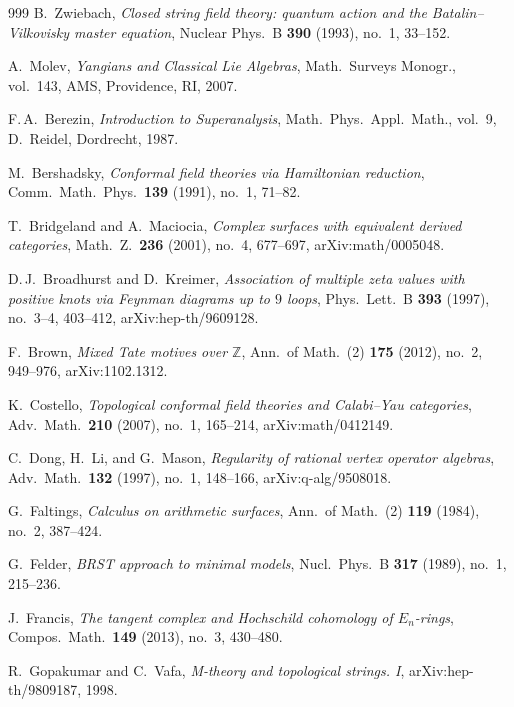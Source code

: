 \documentclass[11pt]{memoir}
\begin{document}
\begin{thebibliography}{999}
B.~Zwiebach, \emph{Closed string field theory: quantum action and the Batalin--Vilkovisky master equation}, Nuclear Phys.\ B \textbf{390} (1993), no.~1, 33--152.

A.~Molev, \emph{Yangians and Classical Lie Algebras}, Math.\ Surveys Monogr., vol.~143, AMS, Providence, RI, 2007.

F.\,A.~Berezin, \emph{Introduction to Superanalysis}, Math.\ Phys.\ Appl.\ Math., vol.~9, D.~Reidel, Dordrecht, 1987.

M.~Bershadsky, \emph{Conformal field theories via Hamiltonian reduction}, Comm.\ Math.\ Phys.\ \textbf{139} (1991), no.~1, 71--82.

T.~Bridgeland and A.~Maciocia, \emph{Complex surfaces with equivalent derived categories}, Math.\ Z.\ \textbf{236} (2001), no.~4, 677--697, arXiv:math/0005048.

D.\,J.~Broadhurst and D.~Kreimer, \emph{Association of multiple zeta values with positive knots via Feynman diagrams up to $9$ loops}, Phys.\ Lett.\ B \textbf{393} (1997), no.~3--4, 403--412, arXiv:hep-th/9609128.

F.~Brown, \emph{Mixed Tate motives over $\mathbb{Z}$}, Ann.\ of Math.\ (2) \textbf{175} (2012), no.~2, 949--976, arXiv:1102.1312.

K.~Costello, \emph{Topological conformal field theories and Calabi--Yau categories}, Adv.\ Math.\ \textbf{210} (2007), no.~1, 165--214, arXiv:math/0412149.

C.~Dong, H.~Li, and G.~Mason, \emph{Regularity of rational vertex operator algebras}, Adv.\ Math.\ \textbf{132} (1997), no.~1, 148--166, arXiv:q-alg/9508018.

G.~Faltings, \emph{Calculus on arithmetic surfaces}, Ann.\ of Math.\ (2) \textbf{119} (1984), no.~2, 387--424.

G.~Felder, \emph{BRST approach to minimal models}, Nucl.\ Phys.\ B \textbf{317} (1989), no.~1, 215--236.

J.~Francis, \emph{The tangent complex and Hochschild cohomology of $E_n$-rings}, Compos.\ Math.\ \textbf{149} (2013), no.~3, 430--480.

R.~Gopakumar and C.~Vafa, \emph{M-theory and topological strings. I}, arXiv:hep-th/9809187, 1998.


\end{thebibliography}
\end{document}
